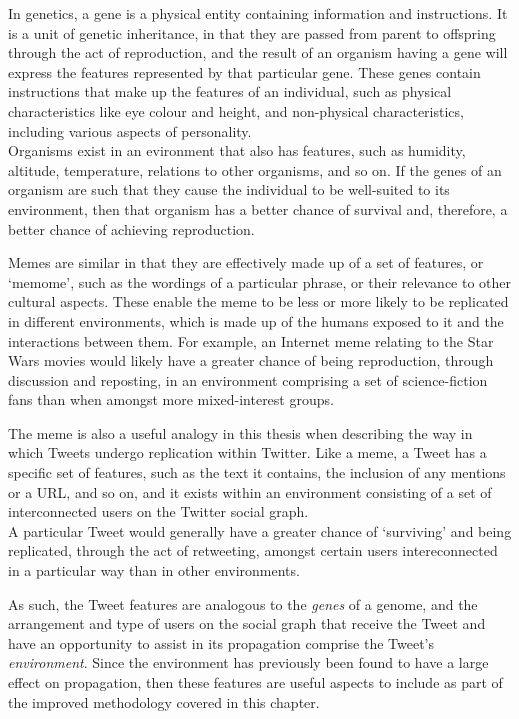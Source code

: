 \begin{enumerate}
In genetics, a gene is a physical entity containing information and instructions. It is a unit of genetic inheritance, in that they are passed from parent to offspring through the act of reproduction, and the result of an organism having a gene will express the features represented by that particular gene. These genes contain instructions that make up the features of an individual, such as physical characteristics like eye colour and height, and non-physical characteristics, including various aspects of personality.\\
Organisms exist in an evironment that also has features, such as humidity, altitude, temperature, relations to other organisms, and so on. If the genes of an organism are such that they cause the individual to be well-suited to its environment, then that organism has a better chance of survival and, therefore, a better chance of achieving reproduction.

Memes are similar in that they are effectively made up of a set of features, or `memome', such as the wordings of a particular phrase, or their relevance to other cultural aspects. These enable the meme to be less or more likely to be replicated in different environments, which is made up of the humans exposed to it and the interactions between them. For example, an Internet meme relating to the Star Wars movies would likely have a greater chance of being reproduction, through discussion and reposting, in an environment comprising a set of science-fiction fans than when amongst more mixed-interest groups.

The meme is also a useful analogy in this thesis when describing the way in which Tweets undergo replication within Twitter. Like a meme, a Tweet has a specific set of features, such as the text it contains, the inclusion of any mentions or a URL, and so on, and it exists within an environment consisting of a set of interconnected users on the Twitter social graph.\\
A particular Tweet would generally have a greater chance of `surviving' and being replicated, through the act of retweeting, amongst certain users intereconnected in a particular way than in other environments.

As such, the Tweet features are analogous to the \textit{genes} of a genome, and the arrangement and type of users on the social graph that receive the Tweet and have an opportunity to assist in its propagation comprise the Tweet's \textit{environment}. Since the environment has previously been found to have a large effect on propagation, then these features are useful aspects to include as part of the improved methodology covered in this chapter.



\end{enumerate}

